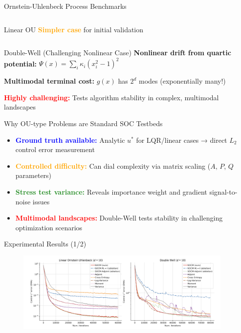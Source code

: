 \documentclass[aspectratio=169,xcolor=dvipsnames]{beamer}
\begin{document}
\begin{frame}[allowframebreaks]{Ornstein-Uhlenbeck Process Benchmarks}
\begin{columns}[t]
\begin{block}{Linear OU}
            \textcolor{orange}{\textbf{Simpler case}} for initial validation
        \end{block}
    \end{columns}
    
    \vspace{0.8cm}
    
    \begin{alertblock}{Double-Well (Challenging Nonlinear Case)}
        \textbf{Nonlinear drift from quartic potential:} $\Psi(x) = \sum_i \kappa_i (x_i^2 - 1)^2$ 
        
        \textbf{Multimodal terminal cost:} $g(x)$ has $2^d$ modes (exponentially many!)
        
        \textcolor{red}{\textbf{Highly challenging:}} Tests algorithm stability in complex, multimodal landscapes
    \end{alertblock}
    
    \vspace{0.5cm}
    
    \begin{block}{Why OU-type Problems are Standard SOC Testbeds}
        \begin{itemize}
            \item \textcolor{blue}{\textbf{Ground truth available:}} Analytic $u^*$ for LQR/linear cases → direct $L_2$ control error measurement
            \item \textcolor{orange}{\textbf{Controlled difficulty:}} Can dial complexity via matrix scaling ($A$, $P$, $Q$ parameters)
            \item \textcolor{ForestGreen}{\textbf{Stress test variance:}} Reveals importance weight and gradient signal-to-noise issues
            \item \textcolor{red}{\textbf{Multimodal landscapes:}} Double-Well tests stability in challenging optimization scenarios
        \end{itemize}
    \end{block}
\end{frame}

\begin{frame}{Experimental Results (1/2)}
    \begin{figure}
        \centering
        \includegraphics[width=0.95\textwidth]{figures/plots_1.png}
    \end{figure}
\end{frame}
\end{document}
